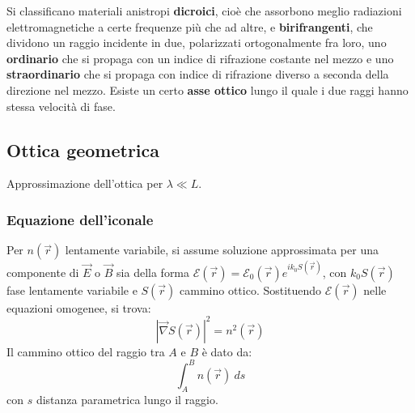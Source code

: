 \documentclass[a4paper]{scrartcl}
\numberwithin{equation}{subsection}
\theoremstyle{style1}
\begin{document}
Si classificano materiali anistropi \textbf{dicroici}, cio\`e che assorbono meglio radiazioni elettromagnetiche a certe frequenze pi\`u che ad altre, e \textbf{birifrangenti}, che dividono un raggio incidente in due, polarizzati ortogonalmente fra loro, uno \textbf{ordinario} che si propaga con un indice di rifrazione costante nel mezzo e uno \textbf{straordinario} che si propaga con indice di rifrazione diverso a seconda della direzione nel mezzo. Esiste un certo \textbf{asse ottico} lungo il quale i due raggi hanno stessa velocit\`a di fase.

\subsection{Ottica geometrica}
Approssimazione dell'ottica per $\lambda \ll L$.
\subsubsection{Equazione dell'iconale}
Per $n(\vec{r})$ lentamente variabile, si assume soluzione approssimata per una componente di $\vec{E}$ o $\vec{B}$ sia della forma $\mathcal{E} (\vec{r}) = \mathcal{E}_0 (\vec{r}) e^{i k_0S(\vec{r})} $, con $k_0S(\vec{r})$ fase lentamente variabile e $S(\vec{r})$ cammino ottico. Sostituendo $\mathcal{E}(\vec{r})$ nelle equazioni omogenee, si trova:
\begin{equation}
	\left\lvert \vec{\nabla }S(\vec{r}) \right\rvert ^2 = n^2 (\vec{r})	
\end{equation}
Il cammino ottico del raggio tra $A$ e $B$ \`e dato da:
\begin{equation}
	\int_{A} ^B n(\vec{r}) \ ds
\end{equation}
con $s$ distanza parametrica lungo il raggio. 
\end{document}

